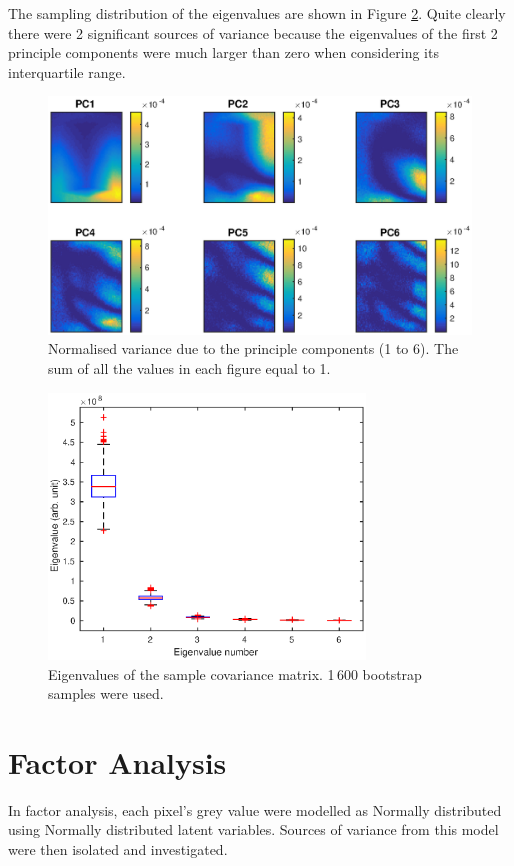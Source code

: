 \documentclass[12pt]{report}
\begin{document}
The sampling distribution of the eigenvalues are shown in Figure \ref{fig:initial_PC_eigenvalues}. Quite clearly there were 2 significant sources of variance because the eigenvalues of the first 2 principle components were much larger than zero when considering its interquartile range.

\begin{figure}[p]
	\includegraphics[width=\textwidth]{figures/initial_PCvariance.eps}
	\caption{Normalised variance due to the principle components (1 to 6). The sum of all the values in each figure equal to 1.}
	\label{fig:initial_PCvariance}
\end{figure}

\begin{figure}[p]
	\centering
	\includegraphics[width=0.75\textwidth]{figures/initial_PC_eigenvalues.eps}
	\caption{Eigenvalues of the sample covariance matrix. 1\,600 bootstrap samples were used.}
	\label{fig:initial_PC_eigenvalues}
\end{figure}

\section{Factor Analysis}
In factor analysis, each pixel's grey value were modelled as Normally distributed using Normally distributed latent variables. Sources of variance from this model  were then isolated and investigated.
\end{document}

